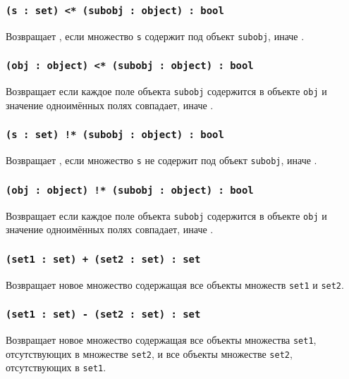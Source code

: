 \subsubsection{\texttt{(s : set) <* (subobj : object) : bool}}

Возвращает \true{}, если множество \texttt{s} содержит под объект \texttt{subobj}, иначе \false{}.

\subsubsection{\texttt{(obj : object) <* (subobj : object) : bool}}

Возвращает \true{} если каждое поле объекта \texttt{subobj} содержится в объекте \texttt{obj} и значение одноимённых полях совпадает, иначе \false{}.

\subsubsection{\texttt{(s : set) !* (subobj : object) : bool}}

Возвращает \true{}, если множество \texttt{s} не содержит под объект \texttt{subobj}, иначе \false{}.

\subsubsection{\texttt{(obj : object) !* (subobj : object) : bool}}

Возвращает \false{} если каждое поле объекта \texttt{subobj} содержится в объекте \texttt{obj} и значение одноимённых полях совпадает, иначе \true{}.

\subsubsection{\texttt{(set1 : set) + (set2 : set) : set}}

Возвращает новое множество содержащая все объекты множеств \texttt{set1} и \texttt{set2}.

\subsubsection{\texttt{(set1 : set) - (set2 : set) : set}}

Возвращает новое множество содержащая все объекты множества \texttt{set1}, отсутствующих в множестве \texttt{set2}, и все объекты множестве \texttt{set2}, отсутствующих в \texttt{set1}.

